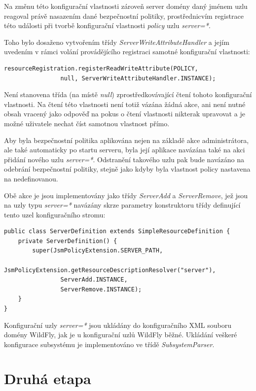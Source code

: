 Na změnu této konfigurační vlastnosti zároveň server domény daný jménem uzlu reagoval právě nasazením dané bezpečnostní politiky, prostřednicvím registrace této události při tvorbě konfigurační vlastnosti {\it policy} uzlu {\it server=*}.

Toho bylo dosaženo vytvořením třídy {\it ServerWriteAttributeHandler} a jejím uvedením v rámci volání provádějícího registraci samotné konfigurační vlastnosti:

\begin{verbatim}
resourceRegistration.registerReadWriteAttribute(POLICY,
                null, ServerWriteAttributeHandler.INSTANCE);
\end{verbatim}

Není stanovena třída (na místě {\it null}) zprostředkovávající čtení tohoto konfigurační vlastnosti. Na čtení této vlastnosti není totiž vázána žádná akce, ani není nutné obsah vracený jako odpověď na pokus o čtení vlastnosti nikterak upravovat a je možné uživatele nechat číst samotnou vlastnost přímo.

Aby byla bezpečnostní politika aplikována nejen na základě akce administrátora, ale také automaticky po startu serveru, byla její aplikace navázána také na akci přidání nového uzlu {\it server=*}. Odstranění takového uzlu pak bude navázáno na odebrání bezpečnostní politiky, stejně jako kdyby byla vlastnost policy nastavena na nedefinovanou.

Obě akce je jsou implementovány jako třídy {\it ServerAdd} a {\it ServerRemove}, jež jsou na uzly typu {\it server=*} navázány skrze parametry konstruktoru třídy definující tento uzel konfiguračního stromu:

\begin{verbatim}
public class ServerDefinition extends SimpleResourceDefinition {
    private ServerDefinition() {
        super(JsmPolicyExtension.SERVER_PATH,
                JsmPolicyExtension.getResourceDescriptionResolver("server"),
                ServerAdd.INSTANCE,
                ServerRemove.INSTANCE);
    }
}
\end{verbatim}

Konfigurační uzly {\it server=*} jsou ukládány do konfiguračního XML souboru domény WildFly, jak je u konfigurační uzlů WildFly běžné. Ukládání veškeré konfigurace subsystému je implementováno ve třídě {\it SubsystemParser}.

\section{Druhá etapa}


